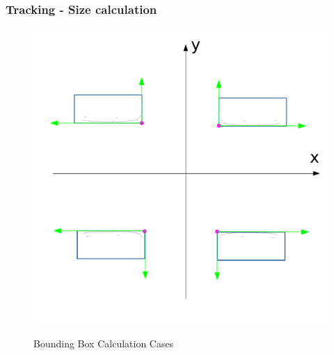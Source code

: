 \documentclass[nosymbols]{beamer}	%
\begin{document}
\begin{frame}
\frametitle{Tracking - Size calculation}
\begin{figure}[!ht]
\begin{center}
\caption{Bounding Box Calculation Cases}
\includegraphics[width=\textwidth,height=0.7\textheight,keepaspectratio]{bilder/cases.pdf}
\label{obst_cases}
\end{center}
\end{figure}
\end{frame}
\end{document}
